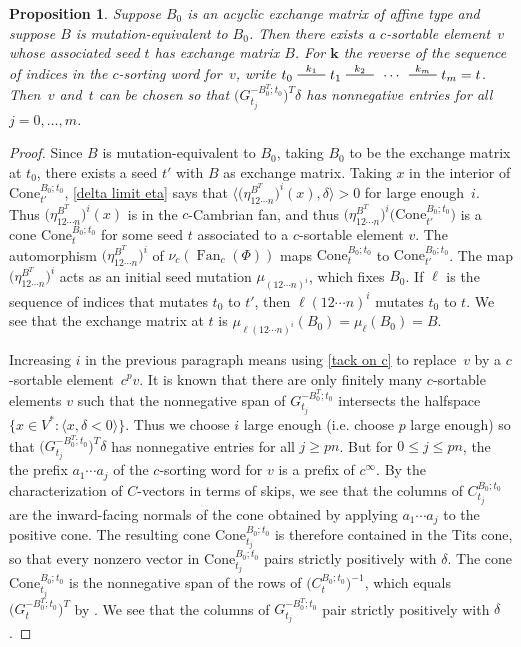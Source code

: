 \documentclass{amsart}
\newtheorem{proposition}{Proposition}[section]
\theoremstyle{definition}
\theoremstyle{remark}
\numberwithin{equation}{section}
\newcommand{\edge}{\,\,\rule[2.7pt]{20pt}{0.5pt}\,\,}
\newcommand{\set}[1]{{\lbrace #1 \rbrace}}
\newcommand{\br}[1]{{\langle #1 \rangle}}
\newcommand{\0}{{\mathbf{0}}}
\newcommand{\Cone}{\mathrm{Cone}}
\newcommand{\kk}{\mathbf{k}}
\renewcommand{\ll}{{\boldsymbol\ell}}
\newcommand{\Fan}{\operatorname{Fan}}
\newcommand{\RSChar}{\Phi}
\newcommand{\RS}{\RSChar}
\begin{document}
\begin{proposition}\label{any B is sort}
Suppose $B_0$ is an acyclic exchange matrix of affine type and suppose $B$ is mutation-equivalent to $B_0$.
Then there exists a $c$-sortable element~$v$ whose associated seed $t$ has exchange matrix $B$.
For $\kk$ the \emph{reverse} of the sequence of indices in the $c$-sorting word for~$v$, write ${t_0\overset{k_1}{\edge}t_1\overset{k_2}{\edge}\,\cdots\,\overset{k_m}{\edge}t_m=t}$.
Then~$v$ and~$t$ can be chosen so that $\bigl(G_{t_j}^{-B_0^T;t_0}\bigr)^T\delta$ has nonnegative entries for all ${j=0,\ldots,m}$.
\end{proposition}
\begin{proof}
Since $B$ is mutation-equivalent to $B_0$, taking $B_0$ to be the exchange matrix at $t_0$, there exists a seed $t'$ with $B$ as exchange matrix.
Taking $x$ in the interior of $\Cone^{B_0;t_0}_{t'}$, \cref{delta limit eta} says that $\br{\bigl(\eta_{12\cdots n}^{B^T}\bigr)^i(x),\delta}>0$  for large enough~$i$.
Thus $\bigl(\eta_{12\cdots n}^{B^T}\bigr)^i(x)$ is in the $c$-Cambrian fan, and thus $\bigl(\eta_{12\cdots n}^{B^T}\bigr)^i\bigl(\Cone^{B_0;t_0}_{t'}\bigr)$ is a cone $\Cone^{B_0;t_0}_t$ for some seed $t$ associated to a $c$-sortable element $v$.
The automorphism $\bigl(\eta_{12\cdots n}^{B^T}\bigr)^i$ of $\nu_c(\Fan_c(\RS))$ maps $\Cone^{B_0;t_0}_t$ to $\Cone^{B_0;t_0}_{t'}$.
The map $\bigl(\eta_{12\cdots n}^{B^T}\bigr)^i$ acts as an initial seed mutation $\mu_{(12\cdots n)^i}$, which fixes $B_0$.
If $\ll$ is the sequence of indices that mutates $t_0$ to $t'$, then $\ll(12\cdots n)^i$ mutates $t_0$ to $t$.
We see that the exchange matrix at $t$ is $\mu_{\ll(12\cdots n)^i}(B_0)=\mu_\ll(B_0)=B$.

Increasing $i$ in the previous paragraph means using \cref{tack on c} to replace~$v$ by a $c$-sortable element~$c^pv$.
It is known \cite[Proposition~4.6]{afframe} that there are only finitely many $c$-sortable elements $v$ such that the nonnegative span of $G_{t_j}^{-B_0^T;t_0}$ intersects the halfspace $\set{x\in V^*:\br{x,\delta<0}}$. 
Thus we choose $i$ large enough (i.e. choose $p$ large enough) so that $\bigl(G_{t_j}^{-B_0^T;t_0}\bigr)^T\delta$ has nonnegative entries for all $j\ge pn$.
But for $0\le j\le pn$, the the prefix $a_1\cdots a_j$ of the $c$-sorting word for $v$ is a prefix of $c^\infty$.
By the characterization of $C$-vectors in terms of skips, we see that the columns of $C_{t_j}^{B_0;t_0}$ are the inward-facing normals of the cone obtained by applying $a_1\cdots a_j$ to the positive cone.
The resulting cone $\Cone^{B_0;t_0}_{t_j}$ is therefore contained in the Tits cone, so that every nonzero vector in $\Cone^{B_0;t_0}_{t_j}$ pairs strictly positively with $\delta$.
The cone $\Cone^{B_0;t_0}_{t_j}$ is the nonnegative span of the rows of $\bigl(C_t^{B_0;t_0}\bigr)^{-1}$, which equals $\bigl(G_t^{-B_0^T;t_0}\bigr)^T$ by \cite[Theorem~1.2]{NZ}.
We see that the columns of $G_{t_j}^{-B_0^T;t_0}$ pair strictly positively with $\delta$.
\end{proof}
\end{document}

